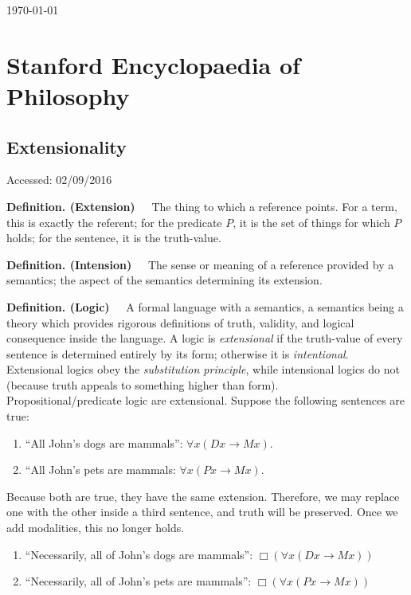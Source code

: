 \documentclass{llncs}
\newcommand{\defn}[1]{
	\textbf{Definition. (#1)~~}
}
\begin{document}
\today

\section{Stanford Encyclopaedia of Philosophy}

\subsection{Extensionality}

\noindent
Accessed: 02/09/2016 \\

\noindent
\defn{Extension} The thing to which a reference points. For a term, this is exactly the referent; for the predicate $P$, it is the set of things for which $P$ holds; for the sentence, it is the truth-value. \\

\noindent
\defn{Intension} The sense or meaning of a reference provided by a semantics; the aspect of the semantics determining its extension. \\

\noindent
\defn{Logic} A formal language with a semantics, a semantics being a theory which provides rigorous definitions of truth, validity, and logical consequence inside the language. A logic is \textit{extensional} if the truth-value of every sentence is determined entirely by its form; otherwise it is \textit{intentional}. Extensional logics obey the \textit{substitution principle}, while intensional logics do not (because truth appeals to something higher than form). \\

\noindent
Propositional/predicate logic are extensional. Suppose the following sentences are true:

\begin{enumerate}
	\item ``All John's dogs are mammals'': $\forall x (D x \rightarrow Mx)$.
	\item ``All John's pets are mammals: $\forall x (P x \rightarrow Mx)$.
\end{enumerate}

\noindent
Because both are true, they have the same extension. Therefore, we may replace one with the other inside a third sentence, and truth will be preserved. Once we add modalities, this no longer holds.

\begin{enumerate}
	\item ``Necessarily, all of John's dogs are mammals'': $\Box (\forall x (Dx \rightarrow Mx))$
	\item ``Necessarily, all of John's pets are mammals'': $\Box (\forall x (Px \rightarrow Mx))$
\end{enumerate}
\end{document}
